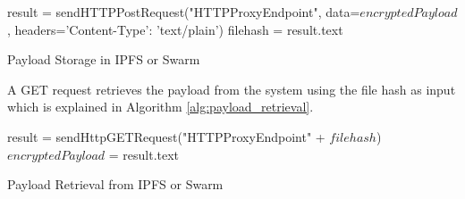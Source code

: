 \documentclass[11pt,openright]{report}
\begin{document}
\begin{algorithm}[setSwarmOrIPFSData]
  result = sendHTTPPostRequest("HTTPProxyEndpoint", data=$encryptedPayload$, headers={'Content-Type': 'text/plain'})\;
  filehash = result.text\;
 \caption{Payload Storage in IPFS or Swarm}
 \label{alg:payload_storage}
\end{algorithm}

A GET request retrieves the payload from the system using the file hash as input which is explained in Algorithm \ref{alg:payload_retrieval}.

\begin{algorithm}[getSwarmOrIPFSData]
  result = sendHttpGETRequest("HTTPProxyEndpoint" + $filehash$)\;
  $encryptedPayload$ = result.text\;
 \caption{Payload Retrieval from IPFS or Swarm}
 \label{alg:payload_retrieval}
\end{algorithm}
\end{document}
